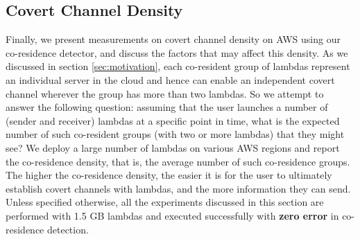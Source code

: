 \subsection{Covert Channel Density}
Finally, we present measurements on covert channel density on AWS using our
co-residence detector, and discuss the factors that may affect this density.  As
we discussed in section \ref{sec:motivation}, each co-resident group of lambdas 
represent an individual server in the cloud and hence can enable an independent 
covert channel wherever the group has more than two lambdas. So we attempt to answer 
the following question: assuming that the user launches a number of
(sender and receiver) lambdas at a specific point in time, what is the expected
number of such co-resident groups (with two or more lambdas) that they might see? 
We deploy a large number of lambdas on various AWS regions and report the co-residence 
density, that is, the average number of such co-residence groups. The higher the 
co-residence density, the easier it is for the user
to ultimately establish covert channels with lambdas, and the more information
they can send. Unless specified otherwise, all the experiments discussed in this
section are performed with 1.5 GB lambdas and executed successfully with
\textbf{zero error} in co-residence detection.


